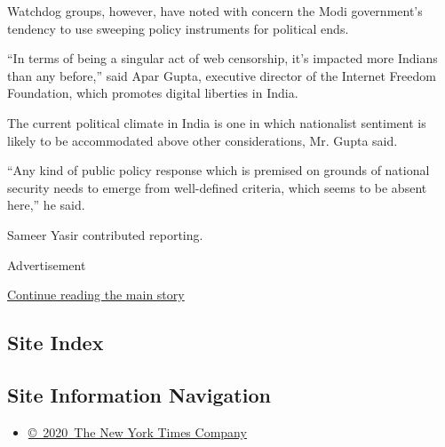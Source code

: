 Watchdog groups, however, have noted with concern the Modi government's
tendency to use sweeping policy instruments for political ends.

``In terms of being a singular act of web censorship, it's impacted more
Indians than any before,'' said Apar Gupta, executive director of the
Internet Freedom Foundation, which promotes digital liberties in India.

The current political climate in India is one in which nationalist
sentiment is likely to be accommodated above other considerations, Mr.
Gupta said.

``Any kind of public policy response which is premised on grounds of
national security needs to emerge from well-defined criteria, which
seems to be absent here,'' he said.

Sameer Yasir contributed reporting.

Advertisement

\protect\hyperlink{after-bottom}{Continue reading the main story}

\hypertarget{site-index}{%
\subsection{Site Index}\label{site-index}}

\hypertarget{site-information-navigation}{%
\subsection{Site Information
Navigation}\label{site-information-navigation}}

\begin{itemize}
\tightlist
\item
  \href{https://help.nytimes.com/hc/en-us/articles/115014792127-Copyright-notice}{©~2020~The
  New York Times Company}
\end{itemize}

